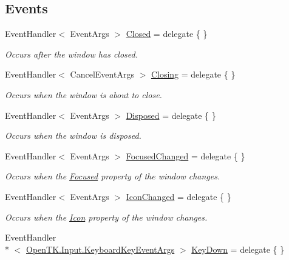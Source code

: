 \subsection*{Events}
\begin{DoxyCompactItemize}
\item 
Event\-Handler$<$ Event\-Args $>$ \hyperlink{class_open_t_k_1_1_native_window_a8eb75858475f8cb49540c8142c4796f9}{Closed} = delegate \{ \}
\begin{DoxyCompactList}\small\item\em Occurs after the window has closed. \end{DoxyCompactList}\item 
Event\-Handler$<$ Cancel\-Event\-Args $>$ \hyperlink{class_open_t_k_1_1_native_window_ac6c8dbb48a823371397548b7c55e5459}{Closing} = delegate \{ \}
\begin{DoxyCompactList}\small\item\em Occurs when the window is about to close. \end{DoxyCompactList}\item 
Event\-Handler$<$ Event\-Args $>$ \hyperlink{class_open_t_k_1_1_native_window_a28187250dc87ba3b721177cd78f8e52b}{Disposed} = delegate \{ \}
\begin{DoxyCompactList}\small\item\em Occurs when the window is disposed. \end{DoxyCompactList}\item 
Event\-Handler$<$ Event\-Args $>$ \hyperlink{class_open_t_k_1_1_native_window_ab499521edced0c062b37a01eefecaf4a}{Focused\-Changed} = delegate \{ \}
\begin{DoxyCompactList}\small\item\em Occurs when the \hyperlink{class_open_t_k_1_1_native_window_ad68c0c086e7733e7a55745425c4faf5d}{Focused} property of the window changes. \end{DoxyCompactList}\item 
Event\-Handler$<$ Event\-Args $>$ \hyperlink{class_open_t_k_1_1_native_window_a585aeb8c100ea173db497c287def293b}{Icon\-Changed} = delegate \{ \}
\begin{DoxyCompactList}\small\item\em Occurs when the \hyperlink{class_open_t_k_1_1_native_window_a6cb12235c07f51662905a238baf65f2d}{Icon} property of the window changes. \end{DoxyCompactList}\item 
Event\-Handler\\*
$<$ \hyperlink{class_open_t_k_1_1_input_1_1_keyboard_key_event_args}{Open\-T\-K.\-Input.\-Keyboard\-Key\-Event\-Args} $>$ \hyperlink{class_open_t_k_1_1_native_window_aba78b8d5243523c3ebb373cc2ab564db}{Key\-Down} = delegate \{ \}

\end{DoxyCompactItemize}
